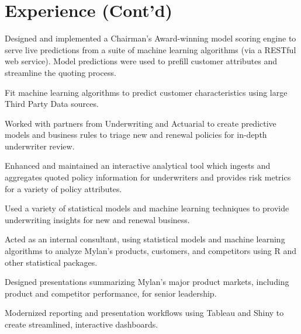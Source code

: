 \documentclass[letterpaper]{deedy-resume} %
\begin{document}
\begin{minipage}[t]{0.9\textwidth}

  \section{Experience (Cont'd)}
  \hfill{}
  \hfill
  \vspace{\topsep}
  \begin{tightitemize}  
  \item Designed and implemented a Chairman's Award-winning model
    scoring engine to serve live predictions from a suite of machine
    learning algorithms (via a RESTful web service). Model predictions were used
    to prefill customer attributes and streamline the quoting process.
  \item Fit machine learning algorithms to predict customer characteristics using
    large Third Party Data sources.
  \item Worked with partners from Underwriting and Actuarial to create
    predictive models and business rules to triage new and renewal
    policies for in-depth underwriter review.
  \item Enhanced and maintained an interactive analytical tool which 
    ingests and aggregates quoted policy information for underwriters
    and provides risk metrics for a variety of policy attributes.
  \item Used a variety of statistical models and machine learning techniques to
    provide underwriting insights for new and renewal business.
  \end{tightitemize}
  \sectionspace
  
  \hfill{}
  \hfill{}
  
  \begin{tightitemize}
  \item Acted as an internal consultant, using statistical models and machine
    learning algorithms to 
    analyze Mylan's products, customers, and competitors using R and
    other statistical packages.
  \item Designed presentations summarizing Mylan's major product markets,
    including product and competitor performance, for senior leadership.
  \item Modernized reporting and presentation workflows using Tableau and
    Shiny to create streamlined, interactive dashboards.
  \end{tightitemize}
  \sectionspace %


\end{minipage}
\end{document}
